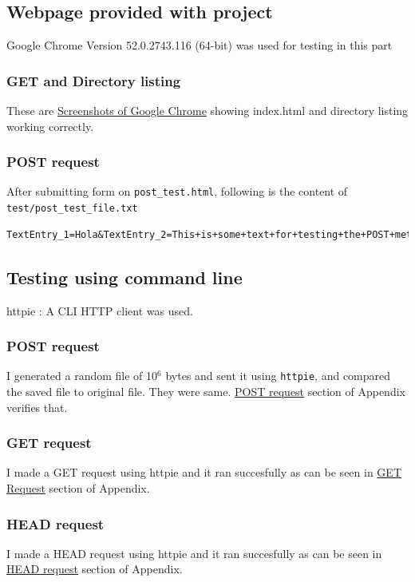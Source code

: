 \documentclass[11pt]{article}
\begin{document}
\subsection{Webpage provided with project}
\label{sec:orgheadline15}
Google Chrome Version 52.0.2743.116 (64-bit) was used for testing in this part
\subsubsection{GET and Directory listing}
\label{sec:orgheadline13}
These are \hyperref[sec:orgheadline12]{Screenshots of Google Chrome} showing index.html and directory listing working correctly.

\subsubsection{POST request}
\label{sec:orgheadline14}
After submitting form on \texttt{post\_test.html}, following is the content of \texttt{test/post\_test\_file.txt}
\begin{verbatim}
TextEntry_1=Hola&TextEntry_2=This+is+some+text+for+testing+the+POST+method.%0D%0A&Item=Item_1
\end{verbatim}
\subsection{Testing using command line}
\label{sec:orgheadline21}
httpie : A CLI HTTP client was used.
\subsubsection{POST request}
\label{sec:orgheadline17}
I generated a random file of 10\(^{\text{6}}\) bytes and sent it using \texttt{httpie}, and compared the saved file to original file. They were same. 
 \hyperref[sec:orgheadline16]{POST request} section of Appendix verifies that.
\subsubsection{GET request}
\label{sec:orgheadline18}
I made a GET request using httpie and it ran succesfully as can be seen in \hyperref[sec:orgheadline12]{GET Request} section of Appendix.
\subsubsection{HEAD request}
\label{sec:orgheadline20}
I made a HEAD request using  httpie and it ran succesfully as can be seen in \hyperref[sec:orgheadline19]{HEAD request} section of Appendix.
\end{document}
